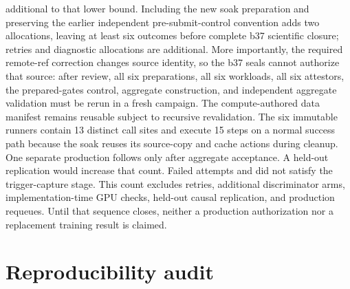 \documentclass[11pt]{article}
\let\pathcode\path
\begin{document}
additional to that lower bound.
Including the new soak preparation and preserving the earlier independent pre-submit-control
convention adds two allocations, leaving at least six outcomes before complete b37 scientific
closure; retries and diagnostic allocations are additional.  More importantly, the required
remote-ref correction changes source identity, so the b37 seals cannot authorize that source: after
review, all six preparations, all six workloads, all six attestors, the prepared-gates control,
aggregate construction, and independent aggregate validation must be rerun in a fresh campaign.
The compute-authored data
manifest remains reusable subject to recursive revalidation.  The six
immutable runners contain 13 distinct \pathcode{srun} call sites and execute 15 steps on a normal
success path because the soak reuses its source-copy and cache actions during cleanup.  One separate
production \pathcode{sbatch} follows only after aggregate acceptance.  A held-out replication would
increase that count.
Failed attempts \pathcode{1838085} and
\pathcode{1838250} did not satisfy the trigger-capture stage.  This count excludes retries, additional
discriminator arms, implementation-time GPU checks, held-out causal replication, and production
requeues.
Until that sequence closes, neither a production authorization nor a replacement training result
is claimed.

\appendix
\section{Reproducibility audit}
\label{app:sources}
\end{document}
